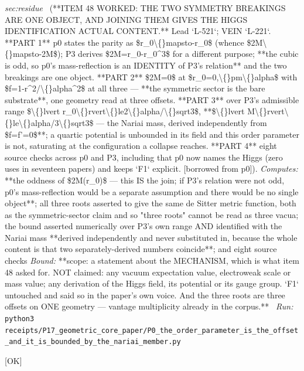 \begin{description}
\textit{sec:residue} \ (**ITEM 48 WORKED: THE TWO SYMMETRY BREAKINGS ARE ONE OBJECT, AND JOINING THEM GIVES THE HIGGS IDENTIFICATION ACTUAL CONTENT.** Lead `L-521`; VEIN `L-221`. **PART 1** p0 states the parity as \$r\_0\textbackslash\{\}mapsto-r\_0\$ (whence \$2M\textbackslash\{\}mapsto-2M\$); P3 derives \$2M=r\_0-r\_0\textasciicircum{}3\$ for a different purpose; **the cubic is odd, so p0's mass-reflection is an IDENTITY of P3's relation** and the two breakings are one object. **PART 2** \$2M=0\$ at \$r\_0=0,\textbackslash\{\}pm\textbackslash\{\}alpha\$ with \$f=1-r\textasciicircum{}2/\textbackslash\{\}alpha\textasciicircum{}2\$ at all three --- **the symmetric sector is the bare substrate**, one geometry read at three offsets. **PART 3** over P3's admissible range \$\textbackslash\{\}lvert r\_0\textbackslash\{\}rvert\textbackslash\{\}le2\textbackslash\{\}alpha/\textbackslash\{\}sqrt3\$, **\$\textbackslash\{\}lvert M\textbackslash\{\}rvert\textbackslash\{\}le\textbackslash\{\}alpha/3\textbackslash\{\}sqrt3\$ --- the Nariai mass, derived independently from \$f=f'=0\$**; a quartic potential is unbounded in its field and this order parameter is not, saturating at the configuration a collapse reaches. **PART 4** eight source checks across p0 and P3, including that p0 now names the Higgs (zero uses in seventeen papers) and keeps `F1` explicit. [borrowed from p0]). 
\emph{Computes:} **the oddness of \$2M(r\_0)\$ --- this IS the join; if P3's relation were not odd, p0's mass-reflection would be a separate assumption and there would be no single object**; all three roots asserted to give the same de Sitter metric function, both as the symmetric-sector claim and so "three roots" cannot be read as three vacua; the bound asserted numerically over P3's own range AND identified with the Nariai mass **derived independently and never substituted in, because the whole content is that two separately-derived numbers coincide**; and eight source checks
 \emph{Bound:} **scope: a statement about the MECHANISM, which is what item 48 asked for. NOT claimed: any vacuum expectation value, electroweak scale or mass value; any derivation of the Higgs field, its potential or its gauge group. `F1` untouched and said so in the paper's own voice. And the three roots are three offsets on ONE geometry --- vantage multiplicity already in the corpus.**
\ \emph{Run:} \texttt{python3 receipts/P17\_geometric\_core\_paper/P0\_the\_order\_parameter\_is\_the\_offset\_and\_it\_is\_bounded\_by\_the\_nariai\_member.py}
\item[\label{rcpt:S1_a_massive_mode_freezes_too_and_the_mass_term_vanishes_at_the_branch_point}\textbf{}\quad\texttt{S1\_a\_massive\_mode\_freezes\_too\_and\_the\_mass\_term\_vanishes\_at\_the\_branch\_point}]\hfill\textsf{[OK]}\\

\end{description}
